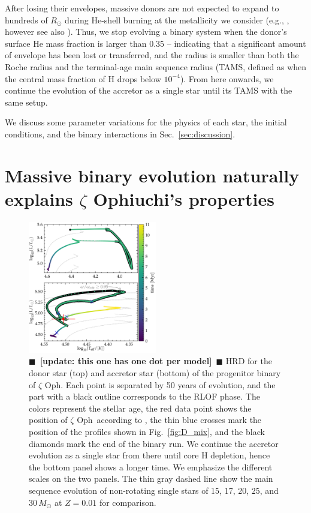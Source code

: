 \documentclass[twocolumn,twocolappendix,trackchanges]{aastex63}
\DeclareRobustCommand{\Figref}[1]{Fig.~\ref{#1}}
\DeclareRobustCommand{\Secref}[1]{Sec.~\ref{#1}}
\newcommand{\zoph}{$\zeta$ Oph}
\newcommand{\todo}[1]{{\large $\blacksquare$~\textbf{\color{red}[#1]}}~$\blacksquare$}
\begin{document}
After losing their envelopes, massive donors are not expected to
expand to hundreds of $R_\odot$ during He-shell burning at the
metallicity we consider (e.g., \citealt{laplace:20}, however see also
\citealt{gilkis:19}). Thus, we stop evolving a binary system when the
donor's surface He mass fraction is larger than 0.35 -- indicating
that a significant amount of envelope has been lost or transferred,
and the radius is smaller than both the Roche radius and the
terminal-age main sequence radius (TAMS, defined as when the central
mass fraction of H drops below $10^{-4}$). From here
onwards, %
we continue the evolution of the accretor as a single star until its TAMS
with the same setup.

We discuss some parameter variations for the physics of each star, the
initial conditions, and the binary interactions in \Secref{sec:discussion}.

\section{Massive binary evolution naturally explains $\zeta$
  Ophiuchi's properties}
\label{sec:best_model}

\begin{figure}[bp]
  \includegraphics[width=0.5\textwidth]{HRD_both}
  \caption{\todo{update: this one has one dot per model} HRD for the donor star (top) and accretor star (bottom) of
    the progenitor binary of \zoph. Each point is separated by 50
    years of evolution, and the part with a black outline corresponds
    to the RLOF phase. The colors represent the stellar age, the red
    data point shows the position of \zoph\ according to
    , the thin blue crosses mark the
    position of the profiles shown in \Figref{fig:D_mix}, and the
    black diamonds mark the end of the binary run. We
    continue the accretor evolution as a single star from there until
    core H depletion, hence the bottom panel shows a longer time. We
    emphasize the different scales on the two panels. The thin gray
    dashed line show the main sequence evolution of non-rotating
    single stars of 15, 17, 20, 25, and 30\,$M_\odot$ at $Z=0.01$ for
    comparison.}
  \label{fig:HRD_both}
\end{figure}
\end{document}
